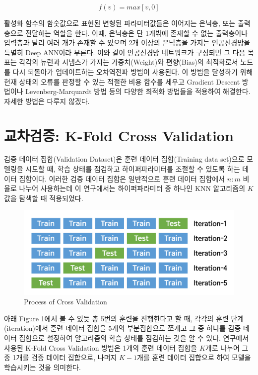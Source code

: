 \documentclass{article}
\begin{document}
\begin{equation}
f(v)=max[v,0]
\end{equation}

활성화 함수의 함숫값으로 표현된 변형된 파라미터값들은 이어지는 은닉층, 또는 출력층으로 전달하는 역할을 한다. 이때, 은닉층은 단 1개밖에 존재할 수 없는 출력층이나 입력층과 달리 여러 개가 존재할 수 있으며 2개 이상의 은닉층을 가지는 인공신경망을 특별히 Deep ANN이라 부른다. 이와 같이 인공신경망 네트워크가 구성되면 그 다음 목표는 각각의 뉴런과 시냅스가 가지는 가중치(Weight)와 편향(Bias)의 최적화로서 노드를 다시 되돌아가 업데이트하는 오차역전파 방법이 사용된다. 이 방법을 달성하기 위해 현재 상태의 오류를 판정할 수 있는 적절한 비용 함수를 세우고 Gradient Descent 방법이나 Levenberg-Marquardt 방법 등의 다양한 최적화 방법들을 적용하여 해결한다. 자세한 방법은 다루지 않겠다.

\section{교차검증: K-Fold Cross Validation}
검증 데이터 집합(Validation Dataset)은 훈련 데이터 집합(Training data set)으로 모델링을 시도할 때, 학습 상태를 점검하고 하이퍼파라미터를 조절할 수 있도록 하는 데이터 집합이다. 이러한 검증 데이터 집합은 일반적으로 훈련 데이터 집합에서 $n:m$ 비율로 나누어 사용하는데 이 연구에서는 하이퍼파라미터 중 하나인 KNN 알고리즘의 $K$값을 탐색할 때 적용되었다.

\begin{figure}[h]
\centering
\includegraphics[scale=0.3]{./fig/Figure_3.png}
\caption{Process of Cross Validation}
\label{fig_1}
\end{figure}

아래 Figure 1에서 볼 수 있듯 총 5번의 훈련을 진행한다고 할 때, 각각의 훈련 단계(iteration)에서 훈련 데이터 집합을 5개의 부분집합으로 쪼개고 그 중 하나를 검증 데이터 집합으로 설정하여 알고리즘의 학습 상태를 점검하는 것을 알 수 있다. 연구에서 사용된 K-Fold Cross Validation 방법은 1개의 훈련 데이터 집합을 $K$개로 나누어 그 중 1개를 검증 데이터 집합으로, 나머지 $K-1$개를 훈련 데이터 집합으로 하여 모델을 학습시키는 것을 의미한다.
\end{document}
